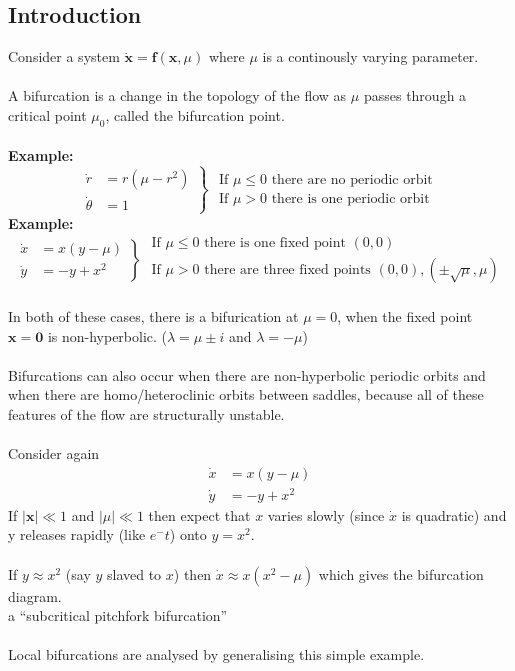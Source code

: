 \documentclass{article}
\newcommand{\example}{\textbf{Example:}}                    %
\newcommand{\bx}{\bm{x}}                                    %
\begin{document}
\subsection{Introduction}
Consider a system $\dot{\bx} = \bm{f}(\bx,\mu)$ where $\mu$ is a continously 
varying parameter.
\\
\\
A bifurcation is a change in the topology of the flow as $\mu$ passes through 
a critical point $\mu_0$, called the bifurcation point.
\\
\\
\example\
\[ \left. \begin{array}{cl} 
\dot{r} &= r(\mu -r^2) \\
\dot{\theta} &= 1 \end{array} \right\}
\begin{array}{l}
\mbox{ If } \mu \leq 0 \mbox{ there are no periodic orbit} \\
\mbox{ If } \mu > 0 \mbox{ there is one periodic orbit }
\end{array} \]
%
\example\
\[ \left. \begin{array}{cl} 
\dot{x} &= x(y-\mu) \\
\dot{y} &= -y+x^2 \end{array} \right\}
\begin{array}{ll}
\mbox{ If } \mu \leq 0 \mbox{ there is one fixed point } (0,0) \\
\mbox{ If } \mu > 0 \mbox{ there are three fixed points } (0,0), (\pm\sqrt{\mu},\mu)
\end{array} \]
\\
In both of these cases, there is a bifurication at $\mu =0$, when the fixed
point $\bx = \bm{0}$ is non-hyperbolic. ($\lambda = \mu \pm i$ and 
$\lambda = -\mu$)
\\
\\
Bifurcations can also occur when there are non-hyperbolic periodic orbits
and when there are homo/heteroclinic orbits between saddles, because all 
of these features of the flow are structurally unstable.
\\
\\
Consider again
\begin{align*}
\dot{x} &=  x(y-\mu) \\
\dot{y} &=  -y + x^2
\end{align*}
If $|\bx| \ll 1$ and $|\mu| \ll 1$ then expect that $x$ varies slowly
(since $\dot{x}$ is quadratic) and y releases rapidly (like $e^-t$) onto
$y=x^2$.
\\
\\
If $y \approx x^2$ (say $y$ slaved to $x$) then $\dot{x} \approx x(x^2 - \mu)$
which gives the bifurcation diagram.
\\ a ``subcritical pitchfork bifurcation'' \\
\\
Local bifurcations are analysed by generalising this simple example.
\\
\end{document}
